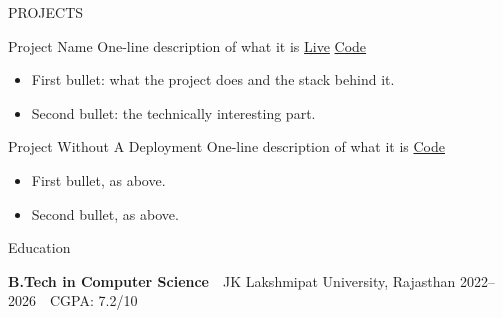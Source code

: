\documentclass{resume} %
\begin{document}
\vspace{-2pt}


\begin{rSection}{PROJECTS}

\setlength{\parskip}{6pt}
\setlength{\parindent}{2pt}

\projectHeading
{Project Name}
{One-line description of what it is}
{\href{https://example.com/}{Live}}
{\href{https://github.com/Riyanshverma/repository}{Code}}

\begin{itemize}
\itemsep -3pt {}

\item First bullet: what the project does and the stack behind it.

\item Second bullet: the technically interesting part.

\end{itemize}

\projectHeading
{Project Without A Deployment}
{One-line description of what it is}
{}
{\href{https://github.com/Riyanshverma/repository}{Code}}

\begin{itemize}
\itemsep -3pt {}

\item First bullet, as above.

\item Second bullet, as above.

\end{itemize}

\end{rSection}


\begin{rSection}{Education}

\textbf{B.Tech in Computer Science}
\,\textbar\,
JK Lakshmipat University, Rajasthan
\hfill
2022--2026
\,\textbar\,
CGPA: 7.2/10

\end{rSection}
\end{document}
